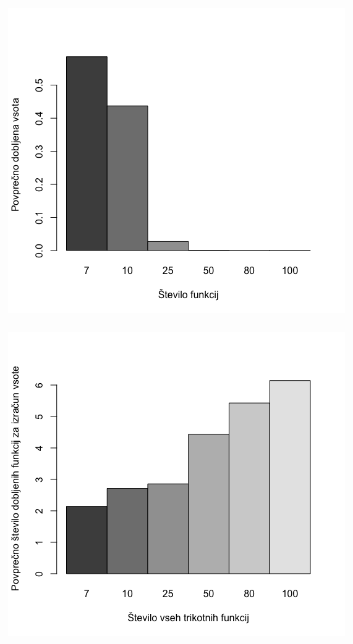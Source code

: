 \documentclass[11pt]{article}
\theoremstyle{definition}
\newcommand{\1}{\mathbbm{1}}
\begin{document}
\begin{figure}[h!]
\begin{center}
	\begin{subfigure}{0.5\textwidth}
	\begin{center}
		\includegraphics[width=0.98\textwidth]{vsota.png}
\end{center}
	\end{subfigure}%
	\begin{subfigure}{0.5\textwidth}
	\begin{center}
		\includegraphics[width=0.98\textwidth]{st_funkcij.png}
\end{center}
	\end{subfigure}
\end{center}
\end{figure}
\end{document}
